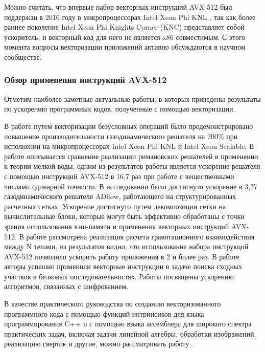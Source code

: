 Можно считать, что впервые набор векторных инструкций AVX-512 был поддержан в 2016 году в микропроцессорах Intel Xeon Phi KNL\label{abbr:knl-5} \cite{Jeffers2016KNL}, так как более раннее поколение Intel Xeon Phi Knights Corner (KNC)\label{abbr:knc-1} представляет собой ускоритель, и векторный код для него не является x86 совместимым.
С этого момента вопросы векторизации приложений активно обсуждаются в научном сообществе.

\subsubsection{Обзор применения инструкций AVX-512}

Отметим наиболее заметные актуальные работы, в которых приведены результаты по ускорению программных кодов, полученные с помощью векторизации.

В работе \cite{Kulikov2019VecAstro} путем векторизации безусловных операций было продемонстрировано повышение производительности газодинамического решателя на 200\% при исполнении на микропроцессорах Intel Xeon Phi KNL и Intel Xeon Scalable.
В работе \cite{Glinting2019VecSwim} описывается сравнение реализации римановских решателей в применении к теории мелкой воды, одним из результатов работы является ускорение решателя с помощью инструкций AVX-512 в 16,7 раз при работе с вещественными числами одинарной точности.
В исследовании \cite{Yildirim2021VecCFD} было достигнуто ускорение в 3,27 газодинамического решателя ADflow, работающего на структурированных расчетных сетках.
Ускорение достигнуто путем декомпозиции сетки на вычислительные блоки, которые могут быть эффективно обработаны с точки зрения использования кэш-памяти и применения векторных инструкций AVX-512.
В работе \cite{Rucci2020VecNBody} рассмотрена реализация расчета гравитационного взаимодействия между N телами, из результатов видно, что использование набора инструкций AVX-512 позволило ускорить работу приложения в 2 и более раз.
В работе \cite{Rucci2019VecSW} авторы успешно применили векторные инструкции в задаче поиска сходных участков в белковых последовательностях.
Работы \cite{Choi2023VecKorean,Cheng2021VecCSIDH} посвящены ускорению алгоритмов, связанных с шифрованием.

В качестве практического руководства по созданию векторизованного программного кода с помощью функций-интринсиков для языка программирования C++ и с помощью языка ассемблера для широкого спектра практических задач, включая задачи линейной алгебры, обработки изображений, реализацию сверток и другие, можно рассматривать работу \cite{Kusswurm2022VecCpp}.

